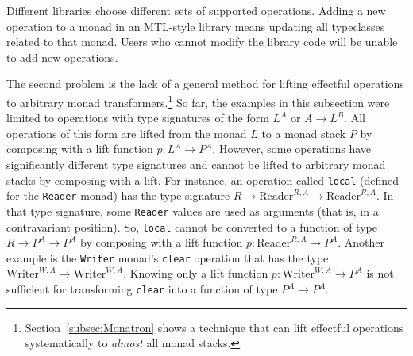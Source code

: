 Different libraries choose different sets of supported operations.
Adding a new operation to a monad in an MTL-style library means updating
all typeclasses related to that monad. Users who cannot modify the
library code will be unable to add new operations.

The second problem is the lack of a general method for lifting effectful
operations to arbitrary monad transformers.\footnote{Section~\ref{subsec:Monatron} shows a technique that can lift effectful
operations systematically to \emph{almost} all monad stacks.} So far, the examples in this subsection were limited to operations
with type signatures of the form $L^{A}$ or $A\rightarrow L^{B}$.
All operations of this form are lifted from the monad $L$ to a monad
stack $P$ by composing with a lift function $p:L^{A}\rightarrow P^{A}$.
However, some operations have significantly different type signatures
and cannot be lifted to arbitrary monad stacks by composing with a
lift. For instance, an operation called \lstinline!local! (defined
for the \lstinline!Reader! monad) has the type signature $R\rightarrow\text{Reader}^{R,A}\rightarrow\text{Reader}^{R,A}$.
In that type signature, some \lstinline!Reader! values are used as
arguments (that is, in a contravariant position). So, \lstinline!local!
cannot be converted to a function of type $R\rightarrow P^{A}\rightarrow P^{A}$
by composing with a lift function $p:\text{Reader}^{R,A}\rightarrow P^{A}$.
Another example is the \lstinline!Writer! monad\textsf{'}s \lstinline!clear!
operation that has the type $\text{Writer}^{W,A}\rightarrow\text{Writer}^{W,A}$.
Knowing only a lift function $p:\text{Writer}^{W,A}\rightarrow P^{A}$
is not sufficient for transforming \lstinline!clear! into a function
of type $P^{A}\rightarrow P^{A}$.

